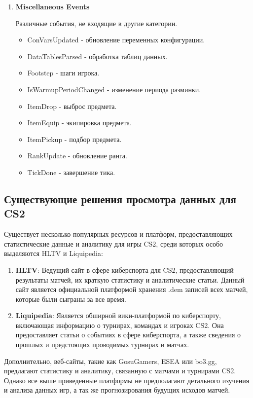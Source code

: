 \begin{enumerate}
	\item \textbf{Miscellaneous Events}
	
	Различные события, не входящие в другие категории.
	\begin{itemize}
		\item ConVarsUpdated - обновление переменных конфигурации.
		\item DataTablesParsed - обработка таблиц данных.
		\item Footstep - шаги игрока.
		\item IsWarmupPeriodChanged - изменение периода разминки.
		\item ItemDrop - выброс предмета.
		\item ItemEquip - экипировка предмета.
		\item ItemPickup - подбор предмета.
		\item RankUpdate - обновление ранга.
		\item TickDone - завершение тика.
	\end{itemize}
\end{enumerate}
\subsection{Существующие решения просмотра данных для CS2}

Существует несколько популярных ресурсов и платформ, предоставляющих статистические данные и аналитику для игры CS2, среди которых особо выделяются HLTV и Liquipedia:

\begin{enumerate}
	\item \textbf{HLTV}:
	Ведущий сайт в сфере киберспорта для CS2, предоставляющий результаты матчей, их краткую статистику и аналитические статьи. Данный сайт является официальной платформой хранения .dem записей всех матчей, которые были сыграны за все время.
	\item \textbf{Liquipedia}:
	Является обширной вики-платформой по киберспорту, включающая информацию о турнирах, командах и игроках CS2. Она предоставляет статьи о событиях в сфере киберспорта, а также сведения о прошлых и предстоящих проводимых турнирах и матчах.
\end{enumerate}

Дополнительно, веб-сайты, такие как GosuGamers, ESEA или bo3.gg, предлагают статистику и аналитику, связанную с матчами и турнирами CS2. Однако все выше приведенные платформы не предполагают детального изучения и анализа данных игр, а так же прогнозирования будущих исходов матчей.